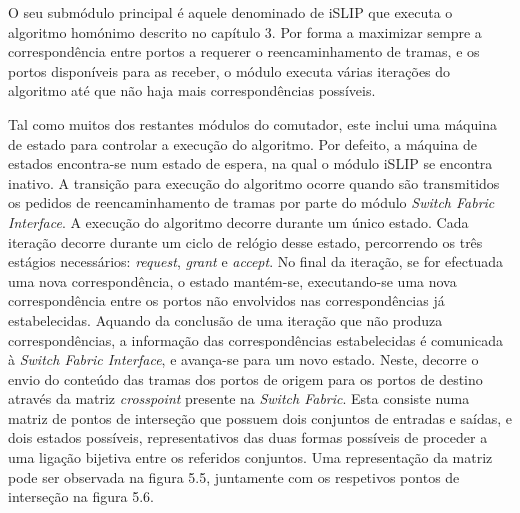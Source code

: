 O seu submódulo principal é aquele denominado de iSLIP que executa o algoritmo homónimo descrito no capítulo 3. Por forma a maximizar sempre a correspondência entre portos a requerer o reencaminhamento de tramas, e os portos disponíveis para as receber, o módulo executa várias iterações do algoritmo até que não haja mais correspondências possíveis. \par Tal como muitos dos restantes módulos do comutador, este inclui uma máquina de estado para controlar a execução do algoritmo. Por defeito, a máquina de estados encontra-se num estado de espera, na qual o módulo iSLIP se encontra inativo. A transição para execução do algoritmo ocorre quando são transmitidos os pedidos de reencaminhamento de tramas por parte do módulo \textit{Switch Fabric Interface}. A execução do algoritmo decorre durante um único estado. Cada iteração decorre durante um ciclo de relógio desse estado, percorrendo os três estágios necessários: \textit{request}, \textit{grant} e \textit{accept}. No final da iteração, se for efectuada uma nova correspondência, o estado mantém-se, executando-se uma nova correspondência entre os portos não envolvidos nas correspondências já estabelecidas. Aquando da conclusão de uma iteração que não produza correspondências, a informação das correspondências estabelecidas é comunicada à \textit{Switch Fabric Interface}, e avança-se para um novo estado. Neste, decorre o envio do conteúdo das tramas dos portos de origem para os portos de destino através da matriz \textit{crosspoint} presente na \textit{Switch Fabric}. Esta consiste numa matriz de pontos de interseção que possuem dois conjuntos de entradas e saídas, e dois estados possíveis, representativos das duas formas possíveis de proceder a uma ligação bijetiva entre os referidos conjuntos. Uma representação da matriz pode ser observada na figura 5.5, juntamente com os respetivos pontos de interseção na figura 5.6.

